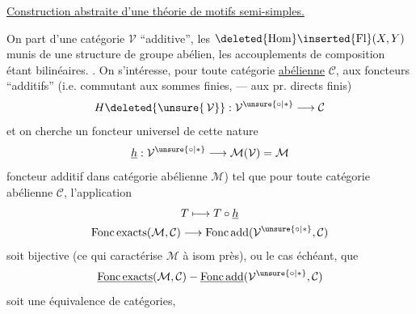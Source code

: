 
\uline{Construction abstraite d'une théorie de motifs semi-simples.}

On part d'une catégorie \(\mathcal V\)
``additive'', 
 les
\(\deleted{\operatorname{Hom}}\inserted{\operatorname{Fl}}(X,Y)\)
 munis de une structure de
groupe abélien, les accouplements de composition
étant bilinéaires.
.
On s'intéresse, pour
toute catégorie \uline{abélienne} \(\mathcal C\), aux foncteurs
 ``additifs''
(i.e. commutant aux sommes
finies, ---  aux pr. directs finis)
\[
H\deleted{\unsure{\,\mathcal V}}:
\mathcal V^{\unsure{\circ|*}}\longrightarrow\mathcal C
\]
et on cherche un foncteur universel
de cette nature
\[
\underline h:\mathcal V^{\unsure{\circ|*}}\longrightarrow\mathcal M(\mathcal V)=\mathcal M
\]
foncteur additif dans catégorie abélienne \(\mathcal M\)) tel
que pour toute catégorie abélienne \(\mathcal C\),
l'application
\[
\begin{gathered}
T\longmapsto T\circ\underline h\\
\operatorname{Fonc\,exacts}(\mathcal M,\mathcal C)
\longrightarrow\operatorname{Fonc\,add}(\mathcal V^{\unsure{\circ|*}},\mathcal C)
\end{gathered}
\]
soit bijective (ce qui caractérise \(\mathcal M\) à 
isom près), ou le cas échéant, que
\[
\underline{\operatorname{Fonc\,exacts}}(\mathcal M,\mathcal C)
\mathbin{-}
\underline{\operatorname{Fonc\,add}}(\mathcal V^{\unsure{\circ|*}},\mathcal C)
\]
soit une équivalence de catégories, 
